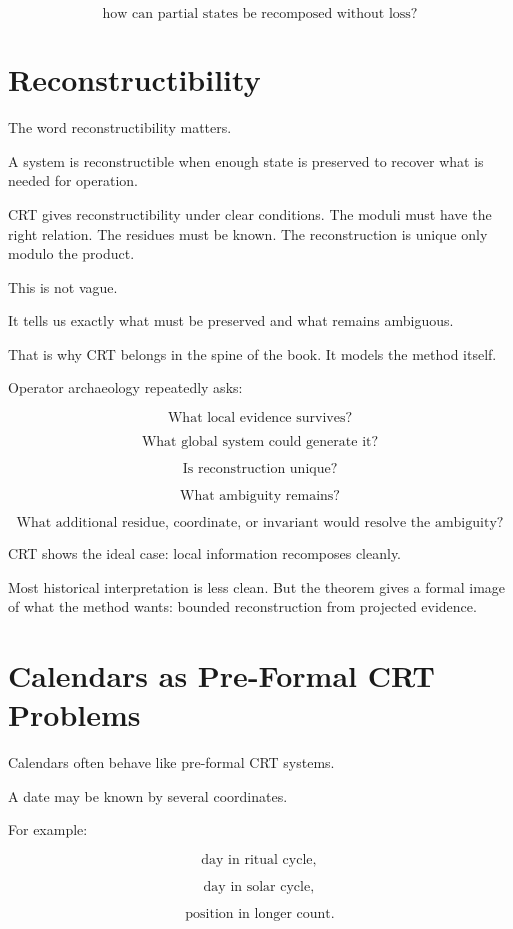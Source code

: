 \documentclass[11pt]{book}
\begin{document}
\[
\text{how can partial states be recomposed without loss?}
\]

\section{Reconstructibility}

The word reconstructibility matters.

A system is reconstructible when enough state is preserved to recover what is needed for operation.

CRT gives reconstructibility under clear conditions. The moduli must have the right relation. The residues must be known. The reconstruction is unique only modulo the product.

This is not vague.

It tells us exactly what must be preserved and what remains ambiguous.

That is why CRT belongs in the spine of the book. It models the method itself.

Operator archaeology repeatedly asks:

\[
\text{What local evidence survives?}
\]

\[
\text{What global system could generate it?}
\]

\[
\text{Is reconstruction unique?}
\]

\[
\text{What ambiguity remains?}
\]

\[
\text{What additional residue, coordinate, or invariant would resolve the ambiguity?}
\]

CRT shows the ideal case: local information recomposes cleanly.

Most historical interpretation is less clean. But the theorem gives a formal image of what the method wants: bounded reconstruction from projected evidence.

\section{Calendars as Pre-Formal CRT Problems}

Calendars often behave like pre-formal CRT systems.

A date may be known by several coordinates.

For example:

\[
\text{day in ritual cycle},
\]

\[
\text{day in solar cycle},
\]

\[
\text{position in longer count}.
\]
\end{document}
